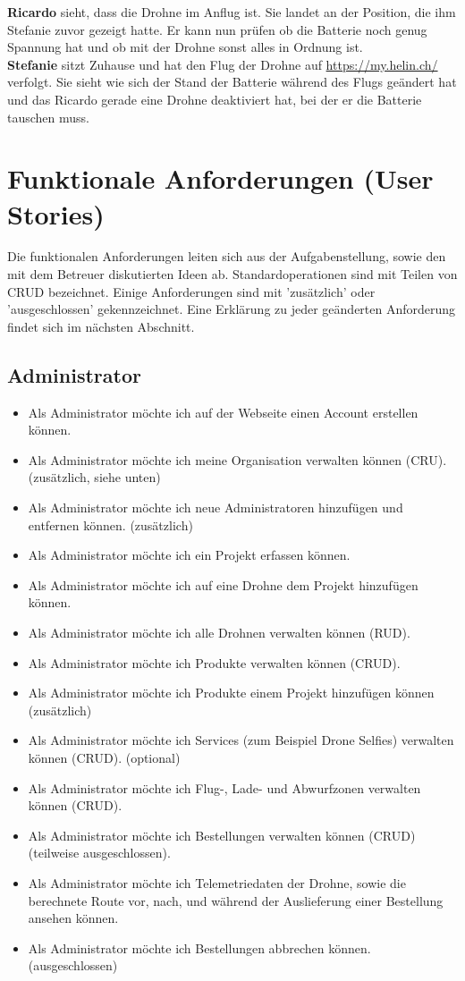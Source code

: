 \textbf{Ricardo} sieht, dass die Drohne im Anflug ist. Sie landet an der Position, die ihm Stefanie zuvor gezeigt hatte. Er kann nun prüfen ob die Batterie noch genug Spannung hat und ob mit der Drohne sonst alles in Ordnung ist.\\

\textbf{Stefanie} sitzt Zuhause und hat den Flug der Drohne auf \url{https://my.helin.ch/} verfolgt. Sie sieht wie sich der Stand der Batterie während des Flugs geändert hat und das Ricardo gerade eine Drohne deaktiviert hat, bei der er die Batterie tauschen muss.

\newpage
\section{Funktionale Anforderungen (User Stories)}

Die funktionalen Anforderungen leiten sich aus der Aufgabenstellung, sowie den mit dem Betreuer diskutierten Ideen ab. Standardoperationen sind mit Teilen von \Gls{CRUD} bezeichnet. Einige Anforderungen sind mit 'zusätzlich' oder 'ausgeschlossen' gekennzeichnet. Eine Erklärung zu jeder geänderten Anforderung findet sich im nächsten Abschnitt.

\subsection{Administrator}
\begin{itemize}
\item Als Administrator möchte ich auf der Webseite einen Account erstellen können.
\item Als Administrator möchte ich meine Organisation verwalten können (CRU). (zusätzlich, siehe unten)
\item Als Administrator möchte ich neue Administratoren hinzufügen und entfernen können. (zusätzlich)
\item Als Administrator möchte ich ein Projekt erfassen können.
\item Als Administrator möchte ich auf eine Drohne dem Projekt hinzufügen können.
\item Als Administrator möchte ich alle Drohnen verwalten können (RUD).
\item Als Administrator möchte ich Produkte verwalten können (CRUD).
\item Als Administrator möchte ich Produkte einem Projekt hinzufügen können (zusätzlich)
\item Als Administrator möchte ich Services (zum Beispiel Drone Selfies) verwalten können (CRUD). (optional)
\item Als Administrator möchte ich Flug-, Lade- und Abwurfzonen verwalten können (CRUD).
\item Als Administrator möchte ich Bestellungen verwalten können (CRUD) (teilweise ausgeschlossen).
\item Als Administrator möchte ich Telemetriedaten der Drohne, sowie die berechnete Route vor, nach, und während der Auslieferung einer Bestellung ansehen können.
\item Als Administrator möchte ich Bestellungen abbrechen können. (ausgeschlossen)
\end{itemize}

